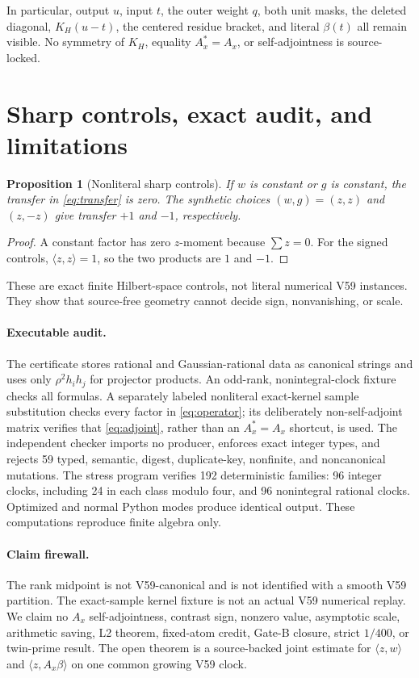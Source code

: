 \documentclass[10pt]{article}
\newtheorem{proposition}[theorem]{Proposition}
\newcommand{\ip}[2]{\langle #1,#2\rangle}
\begin{document}
In particular, output $u$, input $t$, the outer weight $q$, both unit masks,
the deleted diagonal, $K_H(u-t)$, the centered residue bracket, and literal
$\beta(t)$ all remain visible.  No symmetry of $K_H$, equality $A_x^*=A_x$,
or self-adjointness is source-locked.

\section{Sharp controls, exact audit, and limitations}

\begin{proposition}[Nonliteral sharp controls]\label{prop:controls}
If $w$ is constant or $g$ is constant, the transfer in
\eqref{eq:transfer} is zero.  The synthetic choices $(w,g)=(z,z)$ and
$(z,-z)$ give transfer $+1$ and $-1$, respectively.
\end{proposition}

\begin{proof}
A constant factor has zero $z$-moment because $\sum z=0$.  For the signed
controls, $\ip zz=1$, so the two products are $1$ and $-1$.
\end{proof}

These are exact finite Hilbert-space controls, not literal numerical V59
instances.  They show that source-free geometry cannot decide sign,
nonvanishing, or scale.

\paragraph{Executable audit.}
The certificate stores rational and Gaussian-rational data as canonical
strings and uses only $\rho^2h_i h_j$ for projector products.  An odd-rank,
nonintegral-clock fixture checks all formulas.  A separately labeled
nonliteral exact-kernel sample substitution checks every factor in
\eqref{eq:operator}; its deliberately non-self-adjoint matrix verifies that
\eqref{eq:adjoint}, rather than an $A_x^*=A_x$ shortcut, is used.  The
independent checker imports no producer, enforces exact integer types, and
rejects 59 typed, semantic, digest, duplicate-key, nonfinite, and
noncanonical mutations.  The stress program verifies 192 deterministic
families: 96 integer clocks, including 24 in each class modulo four, and 96
nonintegral rational clocks.  Optimized and normal Python modes produce
identical output.  These computations reproduce finite algebra only.

\paragraph{Claim firewall.}
The rank midpoint is not V59-canonical and is not identified with a smooth
V59 partition.  The exact-sample kernel fixture is not an actual V59
numerical replay.  We claim no $A_x$ self-adjointness, contrast sign,
nonzero value, asymptotic scale, arithmetic saving, L2 theorem, fixed-atom
credit, Gate-B closure, strict $1/400$, or twin-prime result.  The open theorem
is a source-backed joint estimate for $\ip zw$ and $\ip z{A_x\beta}$ on one
common growing V59 clock.
\end{document}
